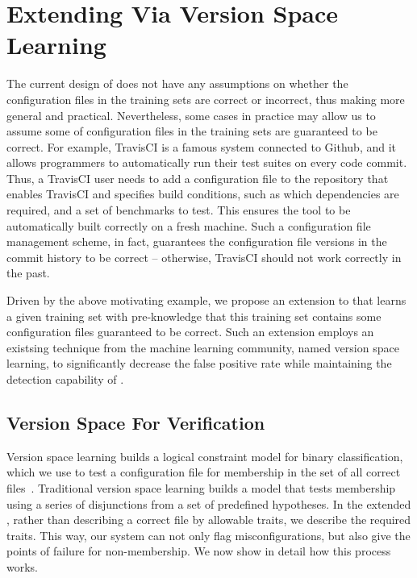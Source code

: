 
\section{Extending \app Via Version Space Learning}
\label{sec:travis}

The current design of \app does not have any assumptions on whether the
configuration files in the training sets are correct or 
incorrect, thus making \app more general and practical.
Nevertheless, some cases in practice 
may allow us to assume some of configuration 
files in the training sets are guaranteed to be correct.
For example, TravisCI is a famous system connected 
to Github, and it allows programmers to automatically run 
their test suites on every code commit. 
Thus, a TravisCI user needs to add a configuration file 
to the repository that 
enables TravisCI and specifies build conditions, 
such as which dependencies are required, 
and a set of benchmarks to test. This ensures 
the tool to be automatically built correctly on a fresh machine.
Such a configuration file management scheme, in fact, guarantees 
the configuration file versions in the commit history to be 
correct -- otherwise, TravisCI should not work correctly in the past.

Driven by the above motivating example, 
we propose an extension to \app that
learns a given training set with pre-knowledge that 
this training set contains some configuration files 
guaranteed to be correct.
Such an extension employs an existsing technique from the machine learning community, named version space learning,
to significantly decrease the false positive rate while maintaining 
the detection capability of \app.

\subsection{Version Space For Verification}

Version space learning builds a logical constraint model for binary
classification, which we use to test a configuration file for membership
in the set of all correct files~\cite{mitchell82}.
Traditional version space learning builds a model that tests membership
using a series of disjunctions from a set of predefined hypotheses.
In the extended \app, rather than describing a correct file by allowable 
traits, we describe the required traits. 
This way, our system can not only flag misconfigurations, 
but also give the points of failure for non-membership.
We now show in detail how this process works.


